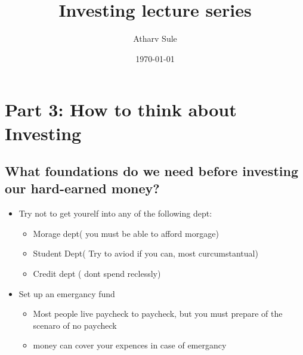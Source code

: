 \documentclass[11pt]{article}
\author{Atharv Sule}
\date{\today}
\title{Investing lecture series}
\begin{document}
\maketitle
\section{}
\label{sec:org5406e4a}
\section{}
\label{sec:orge40a6bb}
\section{Part 3: How to think about Investing}
\label{sec:org005002c}
\subsection{What foundations do we need before investing our hard-earned money?}
\label{sec:orgac7d639}
\begin{itemize}
\item Try not to get yourelf into  any of the following dept:
\begin{itemize}
\item Morage dept( you must be able to afford morgage)
\item Student Dept( Try to aviod if you can, most curcumstantual)
\item Credit dept ( dont spend reclessly)
\end{itemize}
\item Set up an emergancy fund
\begin{itemize}
\item Most people live paycheck to paycheck, but you must prepare of the scenaro of no paycheck
\item money can cover your expences in case of emergancy
\end{itemize}
\end{itemize}
\end{document}
